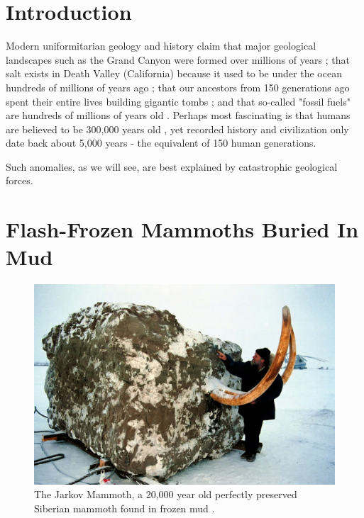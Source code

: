 \documentclass[10pt,twocolumn,letterpaper]{article}
\begin{document}
\section{Introduction}

Modern uniformitarian geology and history claim that major geological landscapes such as the Grand Canyon were formed over millions of years \cite{143}; that salt exists in Death Valley (California) because it used to be under the ocean hundreds of millions of years ago \cite{144}; that our ancestors from 150 generations ago spent their entire lives building gigantic tombs \cite{29,70}; and that so-called "fossil fuels" are hundreds of millions of years old \cite{104}. Perhaps most fascinating is that humans are believed to be 300,000 years old \cite{145}, yet recorded history and civilization only date back about 5,000 years - the equivalent of 150 human generations.

Such anomalies, as we will see, are best explained by catastrophic geological forces.

\section{Flash-Frozen Mammoths Buried In Mud}

\begin{figure}[t]
\begin{center}
   \includegraphics[width=1\linewidth]{jarkov-mammoth.jpg}
\end{center}
   \caption{The Jarkov Mammoth, a 20,000 year old perfectly preserved Siberian mammoth found in frozen mud \cite{51}.}
\label{fig:1}
\label{fig:onecol}
\end{figure}
\end{document}
